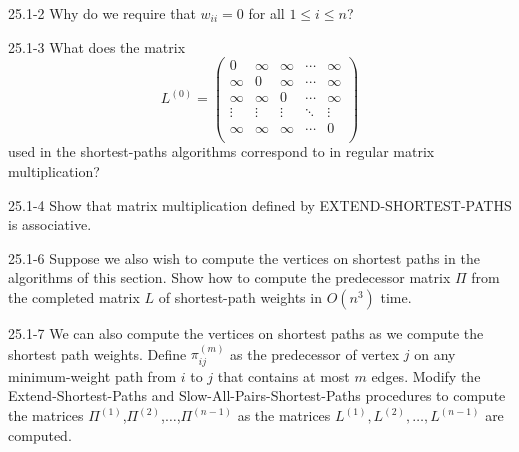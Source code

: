 




\homeworkheader{\classnameandsection}

\begin{problem}{25.1-2}
  Why do we require that $w_{ii} = 0$ for all $1 \le i \le n$?
\end{problem}

\begin{problem}{25.1-3}
What does the matrix
\[
 L^{(0)} =
 \begin{pmatrix}
  0 & \infty & \infty & \cdots & \infty\\
  \infty & 0 & \infty & \cdots & \infty\\
  \infty & \infty & 0 & \cdots & \infty\\
  \vdots & \vdots & \vdots & \ddots & \vdots \\
  \infty & \infty & \infty & \cdots & 0 \\
 \end{pmatrix}
\]
used in the shortest-paths algorithms correspond to in regular matrix multiplication?
\end{problem}

\begin{problem}{25.1-4}
  Show that matrix multiplication defined by EXTEND-SHORTEST-PATHS is associative.
\end{problem}

\begin{problem}{25.1-6}
Suppose we also wish to compute the vertices on shortest paths in the algorithms of this section. Show how to compute
the predecessor matrix $\Pi$ from the completed matrix $L$ of shortest-path weights in $O(n^3)$ time.
\end{problem}

\begin{problem}{25.1-7}
  We can also compute the vertices on shortest paths as we compute the shortest path weights.  Define $\pi^{(m)}_{ij}$
  as the predecessor of vertex $j$ on any minimum-weight path from $i$ to $j$ that contains at most $m$ edges.  Modify
  the Extend-Shortest-Paths and Slow-All-Pairs-Shortest-Paths procedures to compute the matrices
  $\Pi^{(1)}$,$\Pi^{(2)}$,$\ldots$,$\Pi^{(n-1)}$ as the matrices $L^{(1)},L^{(2)},\ldots,L^{(n-1)}$ are computed.
\end{problem}


